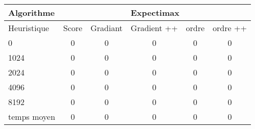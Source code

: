 \documentclass[11pt,a4paper]{article}
\begin{document}
\vspace{2cm}


\begin{tabular}{|l|c|c|c|c|c|} 
   \hline
    Algorithme & \multicolumn{5}{c|}{ Expectimax }\\
    \hline
    Heuristique & Score & Gradiant & Gradient ++ & ordre & ordre ++ \\
    \hline
    0 & 0 & 0 & 0 & 0 & 0\\
    \hline
    1024 & 0 & 0 & 0 & 0 & 0\\
    \hline
    2024 & 0 & 0 & 0 & 0 & 0 \\
    \hline
    4096 & 0 & 0 & 0 & 0 & 0 \\
    \hline
    8192 & 0 & 0 & 0 & 0 & 0 \\
    \hline
    temps moyen & 0 & 0 & 0 & 0 & 0 \\
    \hline
\end{tabular}
\end{document}
